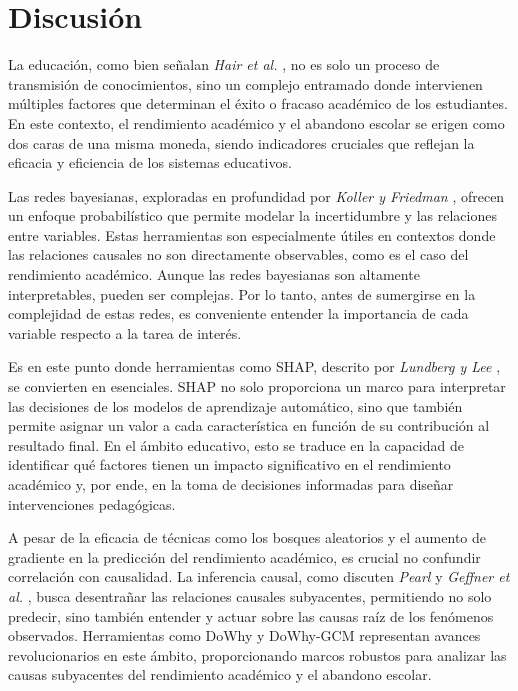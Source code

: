 \hypertarget{discusiuxf3n}{%
\section{Discusión}\label{discusiuxf3n}}

La educación, como bien señalan \textit{Hair et al.} \cite{hair2019advanced}, no es solo un proceso de transmisión de conocimientos, sino un complejo entramado donde intervienen múltiples factores que determinan el éxito o fracaso académico de los estudiantes. En este contexto, el rendimiento académico y el abandono escolar se erigen como dos caras de una misma moneda, siendo indicadores cruciales que reflejan la eficacia y eficiencia de los sistemas educativos.

Las redes bayesianas, exploradas en profundidad por \textit{Koller y Friedman} \cite{koller2009introduction}, ofrecen un enfoque probabilístico que permite modelar la incertidumbre y las relaciones entre variables. Estas herramientas son especialmente útiles en contextos donde las relaciones causales no son directamente observables, como es el caso del rendimiento académico. Aunque las redes bayesianas son altamente interpretables, pueden ser complejas. Por lo tanto, antes de sumergirse en la complejidad de estas redes, es conveniente entender la importancia de cada variable respecto a la tarea de interés.

Es en este punto donde herramientas como SHAP, descrito por \textit{Lundberg y Lee} \cite{lundberg2017unified}, se convierten en esenciales. SHAP no solo proporciona un marco para interpretar las decisiones de los modelos de aprendizaje automático, sino que también permite asignar un valor a cada característica en función de su contribución al resultado final. En el ámbito educativo, esto se traduce en la capacidad de identificar qué factores tienen un impacto significativo en el rendimiento académico y, por ende, en la toma de decisiones informadas para diseñar intervenciones pedagógicas.

A pesar de la eficacia de técnicas como los bosques aleatorios \cite{breiman2001random} y el aumento de gradiente \cite{friedman2000additive} en la predicción del rendimiento académico, es crucial no confundir correlación con causalidad. La inferencia causal, como discuten \textit{Pearl} \cite{pearl2009introduction} y \textit{Geffner et al.} \cite{geffner2022deep}, busca desentrañar las relaciones causales subyacentes, permitiendo no solo predecir, sino también entender y actuar sobre las causas raíz de los fenómenos observados. Herramientas como DoWhy \cite{sharma2020dowhy} y DoWhy-GCM \cite{blobaum2022dowhy} representan avances revolucionarios en este ámbito, proporcionando marcos robustos para analizar las causas subyacentes del rendimiento académico y el abandono escolar.

